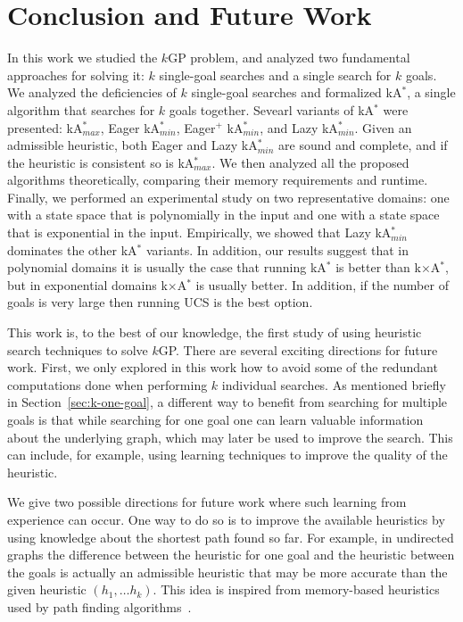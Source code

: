 \documentclass{aicom2e}
\newcommand{\kgs}{$k$GP}
\newcommand{\kastar}{kA$^*$}
\newcommand{\kastarmin}{kA$^*_{min}$}
\newcommand{\kastarmax}{kA$^*_{max}$}
\newcommand{\kxastar}{k$\times$A$^*$}
\begin{document}
\section{Conclusion and Future Work}
In this work we studied the \kgs{} problem, and analyzed two fundamental approaches for solving it: $k$ single-goal searches and a single search for $k$ goals. We analyzed the deficiencies of $k$ single-goal searches and formalized \kastar{}, a single algorithm that searches for $k$ goals together.
Sevearl variants of \kastar{} were presented: \kastarmax{}, Eager \kastarmin{}, Eager$^+$ \kastarmin{}, and Lazy \kastarmin{}. Given an admissible heuristic, both Eager and Lazy \kastarmin{} are sound and complete, and if the heuristic is consistent so is \kastarmax{}. We then analyzed all the proposed algorithms theoretically, comparing their memory requirements and runtime. Finally, we performed an experimental study on two representative domains: one with a state space that is polynomially in the input and one with a state space that is exponential in the input. Empirically, we showed that Lazy \kastarmin{} dominates the other \kastar{} variants. In addition, our results suggest that
in polynomial domains it is usually the case that running \kastar{} is better than \kxastar{}, but in exponential domains \kxastar{} is usually better. In addition, if the number of goals is very large then running UCS is the best option.


This work is, to the best of our knowledge, the first study of using heuristic search techniques to solve \kgs{}. There are several exciting directions for future work. First, we only explored in this work how to avoid some of the redundant computations done when performing $k$ individual searches. As mentioned briefly in Section~\ref{sec:k-one-goal}, a different way to benefit from searching for multiple goals is that while searching for one goal one can learn valuable information about the underlying graph, which may later be used to improve the search. This can include, for example, using learning techniques to improve the quality of the heuristic.


We give two possible directions for future work where such learning from experience can occur. 
One way to do so is to improve the available heuristics by using knowledge about the shortest path found so far. For example, in undirected graphs the difference between the heuristic for one goal and the heuristic between the goals is actually an admissible heuristic that may be more accurate than the given heuristic $(h_1,\ldots h_k)$. This idea is inspired from memory-based heuristics used by path finding algorithms~\cite{sturtevant2007memory,sturtevant2009memory,goldenberg2011theCompressed}.
\end{document}
